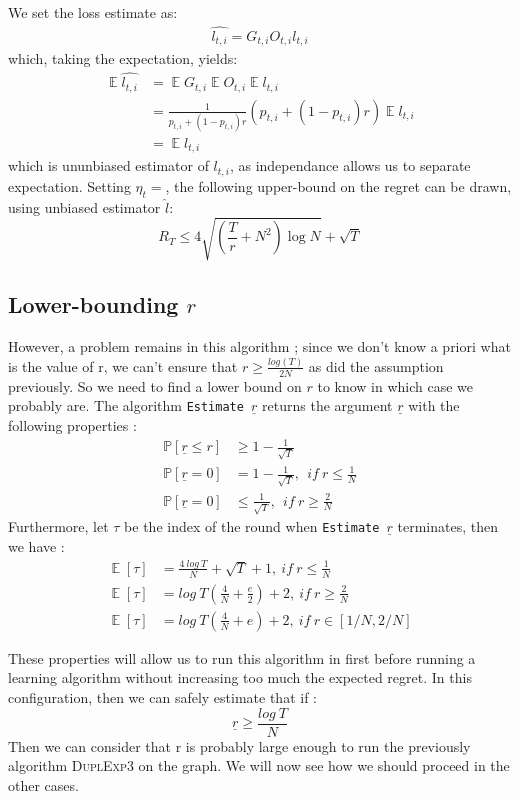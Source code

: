 \documentclass[11pt,a4paper]{article}
\DeclareMathOperator*{\expect}{\mathbb{E}}
\begin{document}
We set the loss estimate as:
\begin{align*}
\hat{l_{t,i}}=G_{t,i}O_{t,i}l_{t,i}
\end{align*}
which, taking the expectation, yields:
\begin{align*}
\expect{\hat{l_{t,i}}}&=\expect{G_{t,i}}\expect{O_{t,i}}\expect{l_{t,i}} \\
&= \frac{1}{p_{t,i}+(1-p_{t,i})r} \left(p_{t,i}+(1-p_{t,i})r\right) \expect{l_{t,i}} \\
&= \expect{l_{t,i}}
\end{align*}
which is ununbiased estimator of $l_{t,i}$, as independance allows us to separate expectation. Setting $\eta_t = $, the following upper-bound on the regret can be drawn, using unbiased estimator $\hat l$:
\[
R_T \leq 4 \sqrt{\left(\frac{T}{r}+N^2\right)\log N}+\sqrt{T}
\]
\subsection{Lower-bounding $r$}
However, a problem remains in this algorithm ; since we don't know a priori what is the value of r, we can't ensure that $ r\geq \frac{log(T)}{2N}$ as did the assumption previously. So we need to find a lower bound on $r$ to know in which case we probably are. The algorithm \verb|Estimate |$\underline{r}$ returns the argument $\underline{r}$ with the following properties : 
\begin{align*}
\mathbb{P} [\underline{r}\leq r]&\geq 1-\frac{1}{\sqrt{T}}\\
\mathbb{P} [\underline{r}=0]&=1-\frac{1}{\sqrt{T}},\ \ if\ r\leq \frac{1}{N}\\
\mathbb{P} [\underline{r}=0]&\leq \frac{1}{\sqrt{T}},\ \ if\ r\geq \frac{2}{N}
\end{align*}
Furthermore, let $\tau$ be the index of the round when \verb|Estimate |$\underline{r}$ terminates, then we have :
\begin{align*}
\expect{[\tau]} & = \frac{4\ log\ T}{N}+\sqrt{T}+1,\ if\ r \leq \frac{1}{N}\\
\expect{[\tau]} & = log\ T \left( \frac{4}{N} + \frac{e}{2} \right) + 2,\ if\ r\geq \frac{2}{N}\\
\expect{[\tau]} & = log\ T \left( \frac{4}{N} + e \right) + 2,\ if\ r \in [1/N,2/N]
\end{align*}

These properties will allow us to run this algorithm in first before running a learning algorithm without increasing too much the expected regret. In this configuration, then we can safely estimate that if :
$$ \underline{r} \geq \frac{log\ T}{N} $$
Then we can consider that r is probably large enough to run the previously algorithm \textsc{DuplExp3} on the graph. We will now see how we should proceed in the other cases.
\end{document}
